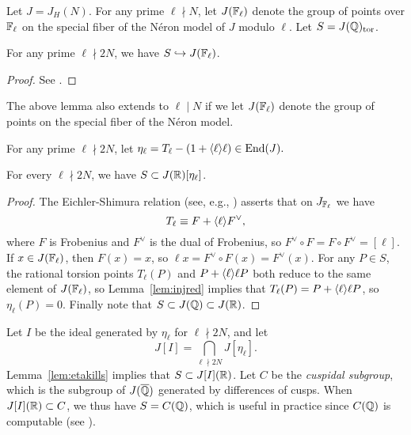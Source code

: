 \documentclass{article}
\begin{document}
Let $J = J_H(N)$. For any prime $\ell\nmid N$, let $J(\mathbb{F}_{\ell})$ denote the
group of points over $\mathbb{F}_{\ell}$ on the special fiber of the N\'eron model of
$J$ modulo $\ell$. Let $S = J(\mathbb{Q})_{\operatorname{tor}}$.

\begin{lemma}\label{lem:injred}
  For any prime $\ell \nmid 2N$, we have $S\hookrightarrow
  J(\mathbb{F}_{\ell})$.
\end{lemma}
\begin{proof}
  See \cite[Appendix]{katz:galois_torsion}.
\end{proof}
\begin{remark}
  The above lemma also extends to $\ell\mid N$ if we let
  $J(\mathbb{F}_{\ell})$ denote the group of points on the special fiber of
  the N\'eron model.
\end{remark}

For any prime $\ell\nmid 2N$, let
$
  \eta_{\ell} = T_{\ell} - (1+\langle\ell\rangle \ell) \in \operatorname{End}(J).
$
\begin{lemma}\label{lem:etakills}
For every $\ell\nmid 2N$,
we have $S \subset J(\mathbb{R})[\eta_{\ell}]$.
\end{lemma}
\begin{proof}
The Eichler-Shimura relation (see, e.g., \cite[Thm.~5.16]{ribet-stein:serre})
asserts that on $J_{\mathbb{F}_{\ell}}$ we have
$$
 T_{\ell} \equiv F + \langle\ell\rangle F^{\vee},
$$
where $F$ is Frobenius and $F^{\vee}$ is the dual of Frobenius, so
$F^{\vee} \circ F = F \circ F^{\vee} = [\ell]$.
If $x \in J(\mathbb{F}_{\ell})$, then $F(x)=x$, so $\ell x = F^{\vee} \circ
F(x) = F^{\vee}(x)$.  For any $P\in S$, the rational torsion points
$T_{\ell}(P)$ and $P + \langle\ell\rangle \ell P$ both reduce to the same
element of $J(\mathbb{F}_{\ell})$, so Lemma~\ref{lem:injred} implies that
$T_{\ell}(P) = P + \langle\ell\rangle \ell P$, so $\eta_{\ell}(P) = 0$.
Finally note that $S\subset J(\mathbb{Q})\subset J(\mathbb{R})$.
\end{proof}

Let $I$ be the ideal generated by $\eta_{\ell}$ for $\ell\nmid 2N$,
and let $$J[I] = \bigcap_{\ell\nmid 2N} J[\eta_{\ell}].$$
Lemma~\ref{lem:etakills} implies that $S \subset J[I](\mathbb{R})$.  Let $C$ be
the {\em cuspidal subgroup}, which is the subgroup of $J(\overline{\mathbb{Q}})$
generated by differences of cusps. When $J[I](\mathbb{R})\subset C$, we thus have
$S=C(\mathbb{Q})$, which is useful in practice since $C(\mathbb{Q})$ is computable
(see \cite{stevens:arithmetic_modular}).
\end{document}
